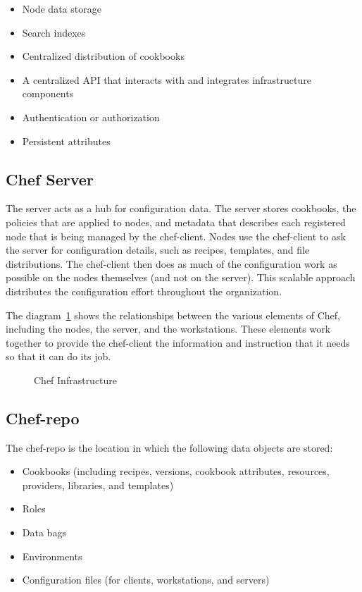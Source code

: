 \begin{itemize}
  \item Node data storage
  \item Search indexes
  \item Centralized distribution of cookbooks
  \item A centralized API that interacts with and integrates infrastructure components
  \item Authentication or authorization
  \item Persistent attributes
\end{itemize}

\subsection{Chef Server}

The server acts as a hub for configuration data. The server stores cookbooks, the policies that are applied to nodes, and metadata that describes each registered node that is being managed by the chef-client. Nodes use the chef-client to ask the server for configuration details, such as recipes, templates, and file distributions. The chef-client then does as much of the configuration work as possible on the nodes themselves (and not on the server). This scalable approach distributes the configuration effort throughout the organization.

The diagram~\ref{fig:overview_chef_draft} shows the relationships between the various elements of Chef, including the nodes, the server, and the workstations. These elements work together to provide the chef-client the information and instruction that it needs so that it can do its job.

\begin{figure}[ht!]
  \caption{Chef Infrastructure}
  \label{fig:overview_chef_draft}
\end{figure}

\subsection{Chef-repo}

The chef-repo is the location in which the following data objects are stored:

\begin{itemize}
  \item Cookbooks (including recipes, versions, cookbook attributes, resources, providers, libraries, and templates)
  \item Roles
  \item Data bags
  \item Environments
  \item Configuration files (for clients, workstations, and servers)
\end{itemize}

